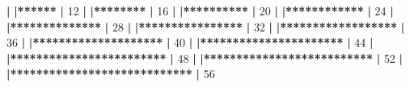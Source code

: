 \documentclass[]{article}
\newenvironment{Shaded}{\begin{snugshade}}{\end{snugshade}}
\newcommand{\DecValTok}[1]{\textcolor[rgb]{0.00,0.00,0.81}{#1}}
\newcommand{\ErrorTok}[1]{\textcolor[rgb]{0.64,0.00,0.00}{\textbf{#1}}}
\newcommand{\NormalTok}[1]{#1}
\newcommand{\OperatorTok}[1]{\textcolor[rgb]{0.81,0.36,0.00}{\textbf{#1}}}
\newcommand{\StringTok}[1]{\textcolor[rgb]{0.31,0.60,0.02}{#1}}
\begin{document}
\begin{Shaded}
\begin{Highlighting}[]
{{{{{{{{{{{{{{{{{{{{{{{{{{{{{  \OperatorTok{|}\StringTok{                                                        }
\StringTok{  }\ErrorTok{|******}\StringTok{                                            }\ErrorTok{|}\StringTok{  }\DecValTok{12}\NormalTok{%
  \OperatorTok{|}\StringTok{                                                        }
\StringTok{  }\ErrorTok{|********}\StringTok{                                          }\ErrorTok{|}\StringTok{  }\DecValTok{16}\NormalTok{%
  \OperatorTok{|}\StringTok{                                                        }
\StringTok{  }\ErrorTok{|**********}\StringTok{                                        }\ErrorTok{|}\StringTok{  }\DecValTok{20}\NormalTok{%
  \OperatorTok{|}\StringTok{                                                        }
\StringTok{  }\ErrorTok{|************}\StringTok{                                      }\ErrorTok{|}\StringTok{  }\DecValTok{24}\NormalTok{%
  \OperatorTok{|}\StringTok{                                                        }
\StringTok{  }\ErrorTok{|**************}\StringTok{                                    }\ErrorTok{|}\StringTok{  }\DecValTok{28}\NormalTok{%
  \OperatorTok{|}\StringTok{                                                        }
\StringTok{  }\ErrorTok{|****************}\StringTok{                                  }\ErrorTok{|}\StringTok{  }\DecValTok{32}\NormalTok{%
  \OperatorTok{|}\StringTok{                                                        }
\StringTok{  }\ErrorTok{|******************}\StringTok{                                }\ErrorTok{|}\StringTok{  }\DecValTok{36}\NormalTok{%
  \OperatorTok{|}\StringTok{                                                        }
\StringTok{  }\ErrorTok{|********************}\StringTok{                              }\ErrorTok{|}\StringTok{  }\DecValTok{40}\NormalTok{%
  \OperatorTok{|}\StringTok{                                                        }
\StringTok{  }\ErrorTok{|**********************}\StringTok{                            }\ErrorTok{|}\StringTok{  }\DecValTok{44}\NormalTok{%
  \OperatorTok{|}\StringTok{                                                        }
\StringTok{  }\ErrorTok{|************************}\StringTok{                          }\ErrorTok{|}\StringTok{  }\DecValTok{48}\NormalTok{%
  \OperatorTok{|}\StringTok{                                                        }
\StringTok{  }\ErrorTok{|**************************}\StringTok{                        }\ErrorTok{|}\StringTok{  }\DecValTok{52}\NormalTok{%
  \OperatorTok{|}\StringTok{                                                        }
\StringTok{  }\ErrorTok{|****************************}\StringTok{                      }\ErrorTok{|}\StringTok{  }\DecValTok{56}\NormalTok{%
}}}}}}}}}}}}}}}}}}}}}}}}}}}}}}}}}}}}}}}}}
\end{Highlighting}
\end{Shaded}
\end{document}
